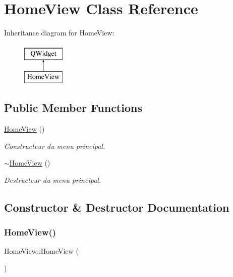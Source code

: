 \hypertarget{class_home_view}{}\section{Home\+View Class Reference}
\label{class_home_view}
Inheritance diagram for Home\+View\+:\begin{figure}[H]
\begin{center}
\leavevmode
\includegraphics[height=2.000000cm]{class_home_view}
\end{center}
\end{figure}
\subsection*{Public Member Functions}
\begin{DoxyCompactItemize}
\item 
\mbox{\hyperlink{class_home_view_ad8dabf904c8162492e50a7ea36afe328}{Home\+View}} ()
\begin{DoxyCompactList}\small\item\em Constructeur du menu principal. \end{DoxyCompactList}\item 
\mbox{\label{class_home_view_ae6c48cdf52876ddc36fde515fed89111}} 
\mbox{\hyperlink{class_home_view_ae6c48cdf52876ddc36fde515fed89111}{$\sim$\+Home\+View}} ()
\begin{DoxyCompactList}\small\item\em Destructeur du menu principal. \end{DoxyCompactList}\end{DoxyCompactItemize}


\subsection{Constructor \& Destructor Documentation}
\mbox{\label{class_home_view_ad8dabf904c8162492e50a7ea36afe328}} 
\subsubsection{\texorpdfstring{Home\+View()}{HomeView()}}
{\footnotesize\ttfamily Home\+View\+::\+Home\+View (\begin{DoxyParamCaption}{ }\end{DoxyParamCaption})}



